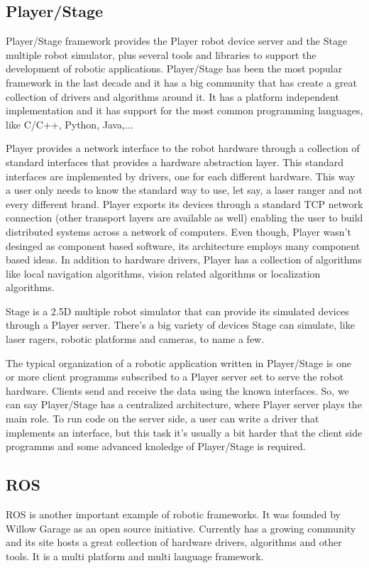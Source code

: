 \documentclass[twocolumn]{svjour3}          %
\begin{document}
\subsection{Player/Stage}
Player/Stage framework provides the Player robot device server and the
Stage multiple robot simulator, plus several tools and libraries to support the
development of robotic applications. Player/Stage has been the most
popular framework in the last decade and it has a big community that
has create a great collection of drivers and algorithms around it. It has a platform independent implementation and it has support for the most common programming languages, like C/C++, Python, Java,...

Player provides a network interface to the robot hardware through a collection of standard
interfaces that provides a hardware abstraction layer. This standard interfaces are implemented by drivers, one
for each different hardware. This way a user only needs to know the
standard way to use, let say, a laser ranger and not every different
brand. Player exports its devices through a standard TCP network
connection  (other transport layers are available as well)
enabling the user to build distributed systems across a network of
computers. Even though, Player wasn't desinged as component based software, its architecture employs many component based
ideas. In addition to hardware drivers, Player has a collection of algorithms
like local navigation algorithms, vision related algorithms or
localization algorithms. 

Stage is a 2.5D multiple robot simulator that can provide its
simulated devices through a Player server. There's a big variety of
devices Stage can simulate, like laser ragers, robotic platforms and
cameras, to name a few.

The typical organization of a robotic application written in Player/Stage is one or more client programms subscribed to a Player server set to serve the robot hardware. Clients send and receive the data using the known interfaces. So, we can say Player/Stage has a centralized architecture, where Player server plays the main role. To run code on the server side, a user can write a driver that implements an interface, but this task it's usually a bit harder that the client side programms and some advanced knoledge of Player/Stage is required.

\subsection{ROS}
ROS is another important example of robotic frameworks. It was founded by Willow Garage as an open source initiative. Currently has a growing community
and its site hosts a great collection of hardware drivers, algorithms
and other tools. It is a multi platform and multi language framework.
\end{document}
